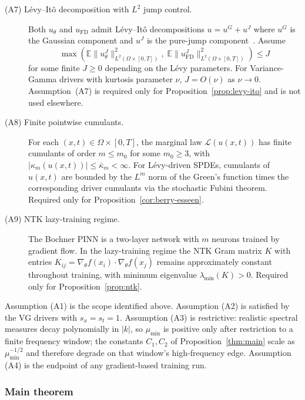 \documentclass[review,12pt]{elsarticle}
\begin{document}
\begin{description}
\item[(A7) L\'evy--It\^o decomposition with $L^2$ jump control.]
Both $u_\theta$ and $u_{\mathrm{FD}}$ admit L\'evy--It\^o decompositions
$u=u^G+u^J$ where $u^G$ is the Gaussian component and $u^J$ is the
pure-jump component~\cite{ContTankov2003}.
Assume
\[
\max\!\left(\mathbb{E}\|u_\theta^J\|^2_{L^2(\Omega\times[0,T])},\;
\mathbb{E}\|u_{\mathrm{FD}}^J\|^2_{L^2(\Omega\times[0,T])}\right)\le J
\]
for some finite $J\ge 0$ depending on the L\'evy parameters.
For Variance-Gamma drivers with kurtosis parameter $\nu$, $J=O(\nu)$
as $\nu\to 0$.
Assumption~(A7) is required only for
Proposition~\ref{prop:levy-ito} and is not used elsewhere.

\item[(A8) Finite pointwise cumulants.]
For each $(x,t)\in\Omega\times[0,T]$, the marginal law
$\mathcal{L}(u(x,t))$ has finite cumulants of order $m\le m_0$ for
some $m_0\ge 3$, with $|\kappa_m(u(x,t))|\le\bar\kappa_m<\infty$.
For Lévy-driven SPDEs, cumulants of $u(x,t)$ are bounded by
the $L^m$ norm of the Green's function times the corresponding driver
cumulants via the stochastic Fubini theorem.
Required only for Proposition~\ref{cor:berry-esseen}.

\item[(A9) NTK lazy-training regime.]
The Bochner PINN is a two-layer network with $m$ neurons trained by
gradient flow. In the lazy-training regime the NTK Gram matrix $K$
with entries $K_{ij}=\nabla_\theta f(x_i)\cdot\nabla_\theta f(x_j)$
remains approximately constant throughout training, with minimum
eigenvalue $\lambda_{\min}(K)>0$.
Required only for Proposition~\ref{prop:ntk}.
\end{description}

Assumption (A1) is the scope identified above.
Assumption (A2) is satisfied by the VG drivers with
\(s_x = s_t = 1\). Assumption (A3) is restrictive: realistic
spectral measures decay polynomially in \(|k|\), so \(\mu_{\min}\)
is positive only after restriction to a finite frequency window;
the constants \(C_1, C_2\) of Proposition~\ref{thm:main} scale as
\(\mu_{\min}^{-1/2}\) and therefore degrade on that window's
high-frequency edge. Assumption (A4) is the endpoint of any
gradient-based training run.

\subsubsection{Main theorem}
\end{document}
